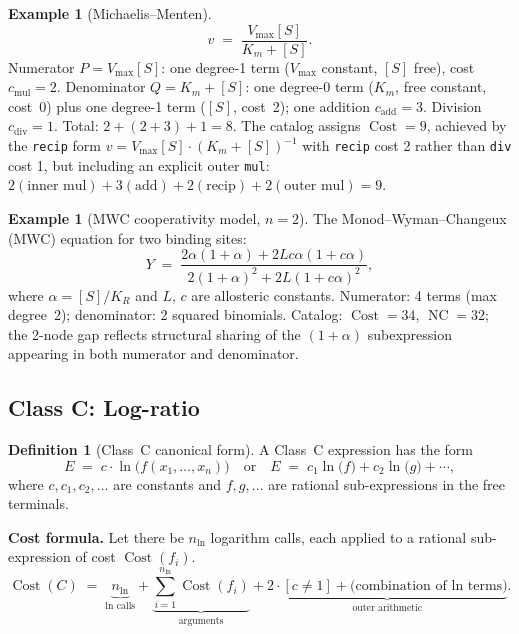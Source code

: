 \documentclass[12pt,a4paper]{article}
\theoremstyle{definition}
\newtheorem{definition}[theorem]{Definition}
\newtheorem{example}[theorem]{Example}
\newcommand{\NC}{\operatorname{NC}}
\newcommand{\Cost}{\operatorname{Cost}}
\newcommand{\cmul}{c_{\mathrm{mul}}}
\newcommand{\cdiv}{c_{\mathrm{div}}}
\newcommand{\cadd}{c_{\mathrm{add}}}
\begin{document}
\begin{example}[Michaelis--Menten]
\[
  v \;=\; \frac{V_{\max}[S]}{K_m + [S]}.
\]
Numerator $P = V_{\max}[S]$: one degree-1 term ($V_{\max}$ constant,
$[S]$ free), cost $\cmul = 2$.
Denominator $Q = K_m + [S]$: one degree-0 term ($K_m$, free constant,
cost~0) plus one degree-1 term ($[S]$, cost~2); one addition $\cadd = 3$.
Division $\cdiv = 1$.
Total: $2 + (2 + 3) + 1 = 8$.
The catalog assigns $\Cost = 9$, achieved by the \texttt{recip} form
$v = V_{\max}[S] \cdot (K_m + [S])^{-1}$ with \texttt{recip} cost 2
rather than \texttt{div} cost 1, but including an explicit outer \texttt{mul}:
$2 (\text{inner mul}) + 3 (\text{add}) + 2 (\text{recip}) + 2 (\text{outer mul}) = 9$.
\end{example}

\begin{example}[MWC cooperativity model, $n=2$]
The Monod--Wyman--Changeux (MWC) equation for two binding sites:
\[
  Y \;=\; \frac{2\alpha(1+\alpha) + 2Lc\alpha(1+c\alpha)}
               {2(1+\alpha)^2 + 2L(1+c\alpha)^2},
\]
where $\alpha = [S]/K_R$ and $L$, $c$ are allosteric constants.
Numerator: 4 terms (max degree~2); denominator: 2 squared binomials.
Catalog: $\Cost = 34$, $\NC = 32$; the 2-node gap reflects structural sharing
of the $(1+\alpha)$ subexpression appearing in both numerator and denominator.
\end{example}

\subsection{Class C: Log-ratio}
\label{subsec:classC}

\begin{definition}[Class~C canonical form]
\label{def:classC}
A Class~C expression has the form
\[
  E \;=\; c \cdot \ln\!\bigl(f(x_1, \ldots, x_n)\bigr)
  \quad\text{or}\quad
  E \;=\; c_1 \ln\!\bigl(f\bigr) + c_2 \ln\!\bigl(g\bigr) + \cdots,
\]
where $c, c_1, c_2, \ldots$ are constants and $f, g, \ldots$ are rational
sub-expressions in the free terminals.
\end{definition}

\noindent\textbf{Cost formula.}
Let there be $n_{\ln}$ logarithm calls, each applied to a rational
sub-expression of cost $\Cost(f_i)$.
\begin{equation}
\label{eq:costC}
  \Cost(C) \;=\;
    \underbrace{n_{\ln}}_{\text{ln calls}}
  + \underbrace{
      \sum_{i=1}^{n_{\ln}} \Cost(f_i)
    }_{\text{arguments}}
  + \underbrace{
      2 \cdot [c \neq 1] + \text{(combination of ln terms)}
    }_{\text{outer arithmetic}}.
\end{equation}
\end{document}
